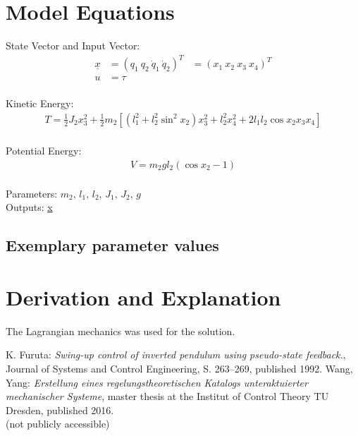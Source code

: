 \documentclass[10pt,a4paper]{article}
\begin{document}
	
	\section{Model Equations} %
	
	State Vector and Input Vector:
	\begin{align*}
		\underline{x} &= (q_1 \ q_2 \ \dot{q}_1 \ \dot{q}_2)^T &= (x_1 \ x_2 \ x_3 \ x_4)^T \\
		u &= \tau\\
	\end{align*}
	
	\noindent Kinetic Energy:			
	\begin{subequations}
	\begin{align}
		T = \frac{1}{2}J_2x_3^2 + \frac{1}{2}m_2[(l_1^2 + l_2^2 \sin^2 x_2)x_3^2 + l_2^2x_4^2 + 2l_1l_2 \cos x_2x_3x_4] \\
	\end{align}
	\end{subequations}
	
	\noindent Potential Energy:			
	\begin{subequations}
	\begin{align}
		V = m_2gl_2(\cos x_2 - 1) \\
	\end{align}
	\end{subequations}

	\noindent
	Parameters: $m_2, \, l_1, \, l_2, \, J_1, \, J_2, \, g$ %
	\\
	Outputs: \underline{x}

	
	
	\subsection{Exemplary parameter values}
	

	
	\section{Derivation and Explanation} %
	
	The Lagrangian mechanics was used for the solution.
	
	
	\begin{thebibliography}{10}	
		K. Furuta: 
		\textit{Swing-up control of inverted pendulum using pseudo-state feedback.}, Journal of Systems and Control Engineering, S. 263–269, published 1992.
		Wang, Yang:  
		\textit{Erstellung eines regelungstheoretischen Katalogs unteraktuierter mechanischer Systeme}, master thesis at the Institut of Control Theory TU Dresden, published 2016. \\
		(not publicly accessible)
	\end{thebibliography}
\end{document}
